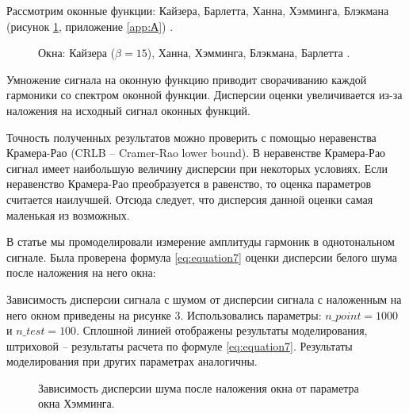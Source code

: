 Рассмотрим оконные функции: Кайзера, Барлетта, Ханна, Хэмминга, Блэкмана (рисунок \ref{img:Windows}, приложение \ref{app:А}) \cite{васеева2020сравнительное,Increase_Accuracy_Yelizarov2014}. 

\begin{figure}[ht]
	\caption{Окна: Кайзера ($\beta=15$), Ханна, Хэмминга, Блэкмана, Барлетта .}\label{img:Windows}
\end{figure}
Умножение сигнала на оконную функцию приводит сворачиванию каждой гармоники со спектром оконной функции. Дисперсии оценки увеличивается из-за наложения на исходный сигнал оконных функций. 

Точность полученных результатов можно проверить с помощью неравенства Крамера-Рао (CRLB -- Cramer-Rao lower bound). В неравенстве Крамера-Рао сигнал имеет наибольшую величину дисперсии при некоторых условиях. Если неравенство Крамера-Рао преобразуется в равенство, то оценка параметров считается наилучшей. Отсюда следует, что дисперсия данной оценки самая маленькая из возможных.

В статье \cite{альтман2020граница} мы промоделировали измерение амплитуды гармоник в однотональном сигнале. Была проверена формула \ref{eq:equation7} оценки дисперсии белого шума после наложения на него окна:

Зависимость дисперсии сигнала с шумом от дисперсии сигнала с наложенным на него окном приведены на рисунке 3. Использовались параметры: $n\_point = 1000$ и $n\_test = 100$. Сплошной линией отображены результаты моделирования, штриховой -- результаты расчета по формуле \ref{eq:equation7}. Результаты моделирования при других параметрах аналогичны.


\begin{figure}[ht]
	\caption{Зависимость дисперсии шума после наложения окна от параметра окна Хэмминга.}\label{img:noise_win_var_hamming}
\end{figure}

